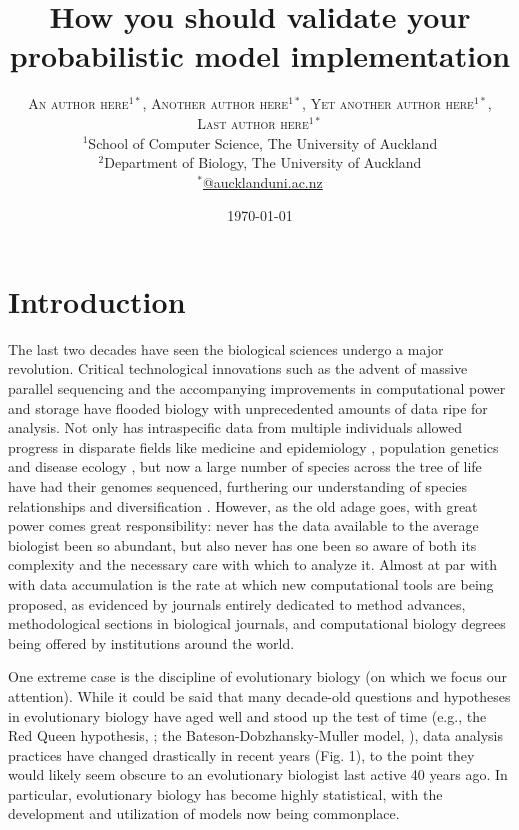 \documentclass[oneside]{article}
\title{How you should validate your probabilistic model implementation} %
\author{\textsc{An author here$^{1*}$}, \textsc{Another author
    here$^{1*}$}, \textsc{Yet another author here$^{1*}$}, \\
  \textsc{Last author here$^{1*}$} \\
\small $^1$School of Computer Science, The University of Auckland\\
\small $^2$Department of Biology, The University of Auckland\\
\small \href{mailto:@aucklanduni.ac.nz}{$^*$@aucklanduni.ac.nz}
}
\date{\today} %
\begin{document}
\maketitle


\section*{Introduction}
The last two decades have seen the biological sciences undergo a major revolution.
Critical technological innovations such as the advent of massive parallel sequencing and the accompanying improvements in computational power and storage have flooded biology with unprecedented amounts of data ripe for analysis.
Not only has intraspecific data from multiple individuals allowed
progress in disparate fields like medicine and epidemiology
\citep[e.g.,][]{1000g,humanmicrobiome,neafsey15}, population genetics \citep[e.g.,][]{lynch07,lack16,demanuel16} and disease ecology \citep[e.g.][]{rosenblum13,bates18}, but now a large number of species across the tree of life have had their genomes sequenced, furthering our understanding of species relationships and diversification \citep[e.g.,][]{Martin_Genome_2013,brawand14,jarvis14,novikova16,Pease2016}.
However, as the old adage goes, with great power comes great responsibility: never has the data available to the average biologist been so abundant, but also never has one been so aware of both its complexity and the necessary care with which to analyze it.
Almost at par with with data accumulation is the rate at which new computational tools are being proposed, as evidenced by journals entirely dedicated to method advances, methodological sections in biological journals, and computational biology degrees being offered by institutions around the world.

One extreme case is the discipline of evolutionary biology (on which we focus our attention).
While it could be said that many decade-old questions and hypotheses
in evolutionary biology have aged well and stood up the test of time
(e.g., the Red Queen hypothesis,
\citealt{vanvalen73,lively87,morran11,gibson15}; the
Bateson-Dobzhansky-Muller model, \citealt{dob36,muller40,hopkins12,roda17}), data analysis
practices have changed drastically in recent years (Fig. 1), to the
point they would likely seem obscure to an evolutionary biologist last active 40 years ago.
In particular, evolutionary biology has become highly statistical, with the development and utilization of models now being commonplace.
\end{document}

